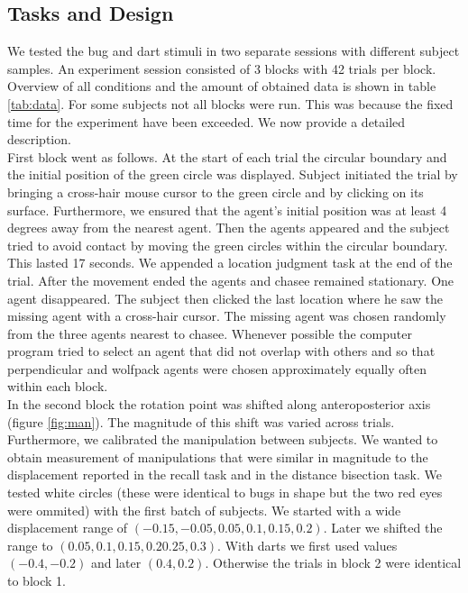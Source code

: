 \documentclass[10pt]{article}
\begin{document}
\subsection*{Tasks and Design}
We tested the bug and dart stimuli in two separate sessions with different subject samples. 
An experiment session consisted of 3 blocks with 42 trials per block.  
Overview of all conditions and the amount of obtained data is shown in table \ref{tab:data}. For some subjects not all blocks were run. This was  because the fixed time for the experiment have been exceeded. 
We now provide a detailed description. \\
First block went as follows. 
At the start of each trial the circular boundary and the initial position of the green circle was displayed. 
Subject initiated the trial by bringing a cross-hair mouse cursor to the green circle and by clicking on its surface. 
Furthermore, we ensured that the agent's initial position was at least 4 degrees away from the nearest agent. 
Then the agents appeared and the subject tried to avoid contact by moving the green circles within the circular boundary. 
This lasted 17 seconds. 
We appended a location judgment task at the end of the trial. 
After the movement ended the agents and chasee remained stationary. 
One agent disappeared. 
The subject then clicked the last location where he saw the missing agent with a cross-hair cursor. 
The missing agent was chosen randomly from the three agents nearest to chasee. 
Whenever possible the computer program tried to select an agent that did not overlap with others and so that perpendicular and wolfpack agents were chosen approximately equally often within each block. \\
In the second block the rotation point was shifted along anteroposterior axis (figure \ref{fig:man}). 
The magnitude of this shift was varied across trials. 
Furthermore, we calibrated the manipulation between subjects. 
We wanted to obtain measurement of manipulations that were similar in magnitude to the displacement reported in the recall task and in the distance bisection task. 
We tested white circles (these were identical to bugs in shape but the two red eyes were ommited) with the first batch of subjects. 
We started with a wide displacement range of $(-0.15, -0.05, 0.05, 0.1, 0.15, 0.2)$. 
Later we shifted the range to $(0.05, 0.1,0.15, 0.2 0.25,0.3)$. 
With darts we first used values $(-0.4, -0.2)$ and later $(0.4, 0.2)$. 
Otherwise the trials in block 2 were identical to block 1. 
\end{document}
